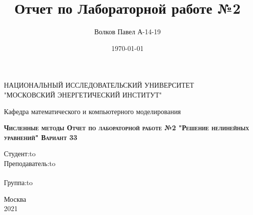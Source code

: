 \documentclass[a4paper,12pt]{report} %
\author{Волков Павел А-14-19}
\title{Отчет по Лабораторной работе №2}
\date{\today}
\begin{document}
\begin{titlepage}
	\newpage

	\begin{center}
	НАЦИОНАЛЬНЫЙ ИССЛЕДОВАТЕЛЬСКИЙ УНИВЕРСИТЕТ\\
		"МОСКОВСКИЙ ЭНЕРГЕТИЧЕСКИЙ ИНСТИТУТ"\\
	\end{center}

	\vspace{8em}	

	\begin{center}
		\Large Кафедра математического и компьютерного моделирования\\ 
	\end{center}

	\vspace{2em}

	\begin{center}
		\textsc{\textbf{ \Large Численные методы \linebreak Отчет по лабораторной работе №2 \linebreak "Решение нелинейных уравнений" \linebreak Вариант 33}}
	\end{center}

	\vspace{6em}



	\newbox{\lbox}
	\newlength{\maxl}
	\setlength{\maxl}{\wd\lbox}
	\hfill\parbox{11cm}{
		\hspace*{5cm}\hspace*{-5cm}Студент:\hfill\hbox to\\
		\hspace*{5cm}\hspace*{-5cm}Преподаватель:\hfill\hbox to\\
		\\
		\hspace*{5cm}\hspace*{-5cm}Группа:\hfill\hbox to\\
	}


	\vspace{\fill}

	\begin{center}
		Москва \\2021
	\end{center}

\end{titlepage}
\end{document}
